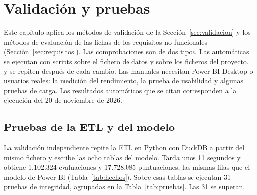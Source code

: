\documentclass[12pt, a4paper, oneside]{report}
\begin{document}
\chapter{Validación y pruebas}
\label{cap:validacion_pruebas}
Este capítulo aplica los métodos de validación de la Sección~\ref{sec:validacion} y los métodos de evaluación de las fichas de los requisitos no funcionales (Sección~\ref{sec:requisitos}). Las comprobaciones son de dos tipos. Las automáticas se ejecutan con scripts sobre el fichero de datos y sobre los ficheros del proyecto, y se repiten después de cada cambio. Las manuales necesitan Power BI Desktop o usuarios reales: la medición del rendimiento, la prueba de usabilidad y algunas pruebas de carga. Los resultados automáticos que se citan corresponden a la ejecución del 20 de noviembre de 2026.

\section{Pruebas de la ETL y del modelo}
\label{sec:val_etl}
La validación independiente repite la ETL en Python con DuckDB a partir del mismo fichero y escribe las ocho tablas del modelo. Tarda unos 11 segundos y obtiene 1.102.324 evaluaciones y 17.728.085 puntuaciones, las mismas filas que el modelo de Power BI (Tabla~\ref{tab:hechos}). Sobre esas tablas se ejecutan 31 pruebas de integridad, agrupadas en la Tabla~\ref{tab:pruebas}. Las 31 se superan.
\end{document}

